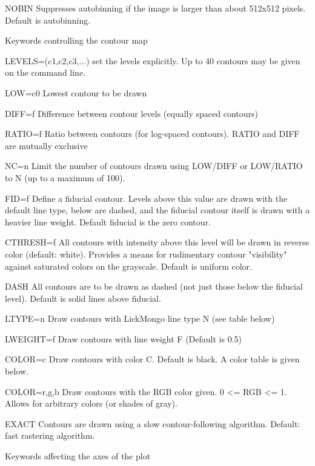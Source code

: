 \begin{command}
  \item[NOBIN]{Suppresses autobinning if the image is larger than about
               512x512 pixels.  Default is autobinning.}
  \item[Keywords controlling the contour map \hfill]{}
  \item[LEVELS=(c1,c2,c3,...)]{set the levels explicitly.  Up to 40 contours 
       may be given on the command line.}
  \item[LOW=c0]{Lowest contour to be drawn}
  \item[DIFF=f]{Difference between contour levels (equally spaced contours)}
  \item[RATIO=f]{Ratio between contours (for log-spaced contours).  RATIO
                 and DIFF are mutually exclusive}
  \item[NC=n]{Limit the number of contours drawn using LOW/DIFF or 
                  LOW/RATIO to N (up to a maximum of 100).}
  \item[FID=f]{Define a fiducial contour.  Levels above this value are
                  drawn with the default line type, below are dashed, and
                  the fiducial contour itself is drawn with a heavier
                  line weight.  Default fiducial is the zero contour.}
  \item[CTHRESH=f]{All contours with intensity above this level will be
                  drawn in reverse color (default: white).  Provides a means
                  for rudimentary contour "visibility" against saturated
                  colors on the grayscale.  Default is uniform color.}
  \item[DASH]{All contours are to be drawn as dashed (not just those below
              the fiducial level).  Default is solid lines above fiducial.}
  \item[LTYPE=n ]{Draw contours with LickMongo line type N (see table below)}
  \item[LWEIGHT=f]{Draw contours with line weight F (Default is 0.5)}
  \item[COLOR=c]{Draw contours with color C.  Default is black.  A color table 
                 is given below.}
  \item[COLOR=r,g,b]{ Draw contours with the RGB color given.  0 <= RGB <= 1.  
               Allows for arbitrary colors (or shades of gray).}
  \item[EXACT]{Contours are drawn using a slow contour-following algorithm.
               Default: fast rastering algorithm.}
  \item[Keywords affecting the axes of the plot\hfill]{}

\end{command}

